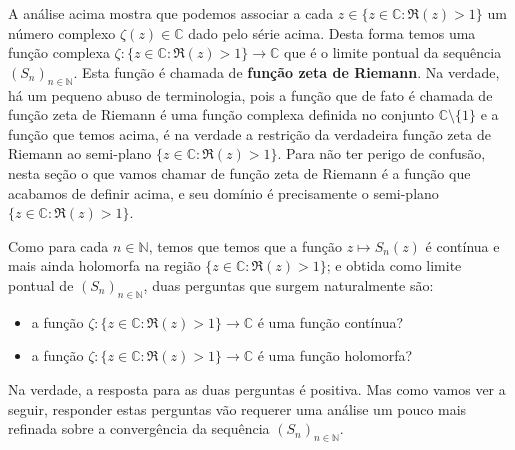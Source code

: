 A análise acima mostra que podemos associar a cada $z\in\{z\in\mathbb{C}: \Re(z)>1\}$ 
um número complexo $\zeta(z)\in\mathbb{C}$ dado pelo série acima.
Desta forma temos uma função complexa $\zeta:\{z\in\mathbb{C}: \Re(z)>1\}\to\mathbb{C}$
que é o limite pontual da sequência $(S_n)_{n\in\mathbb{N}}$. 
Esta função é chamada de \textbf{função zeta de Riemann}.
Na verdade, há um pequeno abuso de terminologia, pois a função que de fato é chamada
de função zeta de Riemann é uma função complexa definida no conjunto $\mathbb{C}\setminus\{1\}$
e a função que temos acima, é na verdade a restrição da verdadeira função zeta de Riemann
ao semi-plano $\{z\in\mathbb{C}: \Re(z)>1\}$.
Para não ter perigo de confusão, nesta seção o que vamos chamar 
de função zeta de Riemann é a
função que acabamos de definir acima, e seu domínio é precisamente o 
semi-plano $\{z\in\mathbb{C}: \Re(z)>1\}$.

Como para cada $n\in\mathbb{N}$, temos que 
temos que a função $z\longmapsto S_n(z)$ é contínua e mais ainda holomorfa
na região $\{z\in\mathbb{C}: \Re(z)>1\}$; e obtida como limite pontual de $(S_n)_{n\in\mathbb{N}}$, duas perguntas que surgem naturalmente são:
\begin{itemize}
	\item a função $\zeta:\{z\in\mathbb{C}: \Re(z)>1\}\to\mathbb{C}$ é uma função contínua?  
	\item a função $\zeta:\{z\in\mathbb{C}: \Re(z)>1\}\to\mathbb{C}$ é uma função holomorfa?
\end{itemize}

Na verdade, a resposta para as duas perguntas é positiva. Mas como vamos
ver a seguir, responder estas perguntas vão requerer uma análise um pouco mais
refinada sobre a convergência da sequência $(S_n)_{n\in\mathbb{N}}$.


